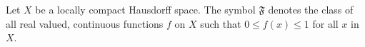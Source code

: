 Let $X$ be a locally compact Hausdorff space. The symbol $\mathfrak{F}$ denotes the class of all real valued, continuous functions $f$ on $X$ such that $0 \leq f(x) \leq 1$ for all $x$ in $X$.
